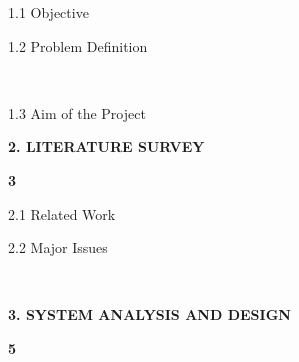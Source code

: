 \documentclass[a4paper,12pt, English]{article}
\newcommand\tab[1][1cm]{\hspace*{#1}}
\begin{document}
\begin{titlepage}
{\begin{large}
{\tab\tab 1.1 Objective}
\end{large}
}
{
\begin{large}
\hspace{10.55cm}
\end{large}
}

{\begin{large}
{\tab\tab 1.2 Problem Definition}
\end{large}
}
{
\begin{large}
\hspace{8.58cm}
\end{large}
}\\
{\begin{large}
{\tab\tab 1.3 Aim of the Project }
\end{large}
} 
{
\begin{large}
\hspace{8.58cm}
\end{large}
}

\noindent 
{\begin{large}
\textbf{\tab 2. LITERATURE SURVEY}
\end{large}
} 
{
\begin{large}
\hspace{8.15cm}\textbf{3}
\end{large}
}

{\begin{large}
{\tab\tab 2.1 Related Work}
\end{large}
}
{
\begin{large}
\hspace{9.7cm}
\end{large}
}

{\begin{large}
{\tab\tab 2.2 Major Issues}
\end{large}
} 
{
\begin{large}
\hspace{9.9cm}
\end{large}
}\\
\noindent 
{\begin{large}
\textbf{\tab  3. SYSTEM ANALYSIS AND DESIGN }
\end{large}
}
{
\begin{large}
\hspace{5.6cm}\textbf{5}
\end{large}
}



\end{titlepage}
\end{document}
